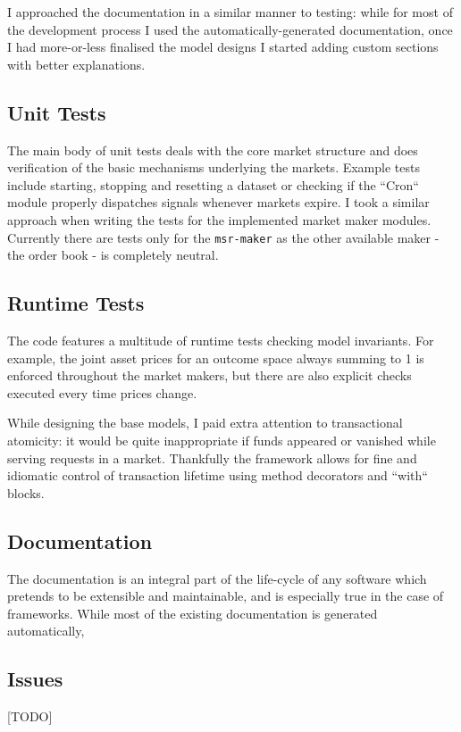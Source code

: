\documentclass[bsc,frontabs,twoside,singlespacing,parskip,deptreport]{infthesis}     %
\begin{document}
I approached the documentation in a similar manner to testing: while for most of the development process I used the automatically-generated documentation, once I had more-or-less finalised the model designs I started adding custom sections with better explanations. 

\subsection{Unit Tests}



    The main body of unit tests deals with the core market structure and does verification of the basic mechanisms underlying the markets. Example tests include starting, stopping and resetting a dataset or checking if the ``Cron`` module properly dispatches signals whenever markets expire. 
    I took a similar approach when writing the tests for the implemented market maker modules. Currently there are tests only for the {\tt msr-maker} as the other available maker - the order book - is completely neutral. 
    
\subsection{Runtime Tests}
    
    The code features a multitude of runtime tests checking model invariants. For example, the joint asset prices for an outcome space always summing to 1 is enforced throughout the market makers, but there are also explicit checks executed every time prices change.

    While designing the base models, I paid extra attention to transactional atomicity: it would be quite inappropriate if funds appeared or vanished while serving requests in a market. Thankfully the framework allows for fine and idiomatic control of transaction lifetime using method decorators and ``with`` blocks.

\subsection{Documentation}

    The documentation is an integral part of the life-cycle of any software which pretends to be extensible and maintainable, and is especially true in the case of frameworks. While most of the existing documentation is generated automatically, 
    
\subsection{Issues}
    [TODO]
    
\end{document}
